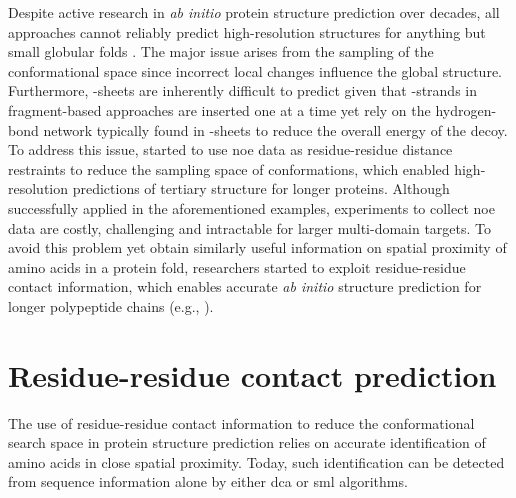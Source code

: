 Despite active research in \textit{ab initio} protein structure prediction over decades, all approaches cannot reliably predict high-resolution structures for anything but small globular folds \cite{Bradley2005-lw,Tai2014-rz,He2013-gm,Kinch2011-py}. The major issue arises from the sampling of the conformational space since incorrect local changes influence the global structure. Furthermore, \textbeta-sheets are inherently difficult to predict given that \textbeta-strands in fragment-based approaches are inserted one at a time yet rely on the hydrogen-bond network typically found in \textbeta-sheets to reduce the overall energy of the decoy. To address this issue, \textcite{Lange2012-yh,Raman2010-xv,Gobl2014-gc} started to use \gls{noe} data as residue-residue distance restraints to reduce the sampling space of conformations, which enabled high-resolution predictions of tertiary structure for longer proteins. Although successfully applied in the aforementioned examples, experiments to collect \gls{noe} data are costly, challenging and intractable for larger multi-domain targets. To avoid this problem yet obtain similarly useful information on spatial proximity of amino acids in a protein fold, researchers started to exploit residue-residue contact information, which enables accurate \textit{ab initio} structure prediction for longer polypeptide chains (e.g., \cite{Marks2011-os,Michel2014-eg,Kosciolek2014-bt,Ovchinnikov2015-tn,Ovchinnikov2016-jj,Michel2017-xh,De_Oliveira2017-sg,Ovchinnikov2017-nd,Wang2017-rx}).

%
%

\section{Residue-residue contact prediction} \label{sec:introduction_contact_prediction}
The use of residue-residue contact information to reduce the conformational search space in protein structure prediction relies on accurate identification of amino acids in close spatial proximity. Today, such identification can be detected from sequence information alone by either \gls{dca} or \gls{sml} algorithms.

